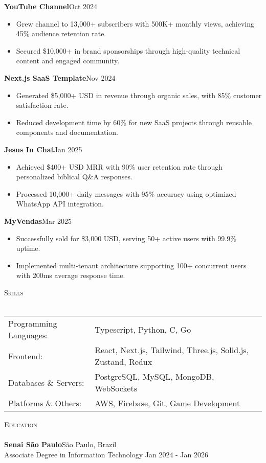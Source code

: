 \documentclass[a4paper]{article}
\newcommand{\lineunder}{
    \vspace*{-8pt} \\
    \hspace*{-18pt} \hrulefill \\
}
\newcommand{\header}[1]{
    {\hspace*{-18pt}\vspace*{6pt} \textsc{#1}}
    \vspace*{-6pt} \lineunder
}
\begin{document}
    \textbf{YouTube Channel}\hfill  Oct 2024\\
    \vspace{-3mm}
    \begin{itemize} \itemsep -3pt
        \item Grew channel to 13,000+ subscribers with 500K+ monthly views, achieving 45\% audience retention rate.
        \item Secured \$10,000+ in brand sponsorships through high-quality technical content and engaged community.
    \end{itemize}

    \textbf{Next.js SaaS Template}\hfill  Nov 2024\\
    \vspace{-3mm}
    \begin{itemize} \itemsep -3pt
        \item Generated \$5,000+ USD in revenue through organic sales, with 85\% customer satisfaction rate.
        \item Reduced development time by 60\% for new SaaS projects through reusable components and documentation.
    \end{itemize}

    \textbf{Jesus In Chat}\hfill  Jan 2025\\
    \vspace{-3mm}
    \begin{itemize} \itemsep -3pt
        \item Achieved \$400+ USD MRR with 90\% user retention rate through personalized biblical Q\&A responses.
        \item Processed 10,000+ daily messages with 95\% accuracy using optimized WhatsApp API integration.
    \end{itemize}

    \textbf{MyVendas}\hfill  Mar 2025\\
    \vspace{-3mm}
    \begin{itemize} \itemsep -3pt
        \item Successfully sold for \$3,000 USD, serving 50+ active users with 99.9\% uptime.
        \item Implemented multi-tenant architecture supporting 100+ concurrent users with 200ms average response time.
    \end{itemize}

    \vspace{1mm}

    \header{Skills}
    \vspace{2mm}
    \begin{longtable}{p{4cm}p{12cm}}
        Programming Languages: & Typescript, Python, C, Go \\
        Frontend: & React, Next.js, Tailwind, Three.js, Solid.js, Zustand, Redux \\
        Databases \& Servers: & PostgreSQL, MySQL, MongoDB, WebSockets \\
        Platforms \& Others: & AWS, Firebase, Git, Game Development \\
    \end{longtable}
    \vspace{1mm}

    \header{Education}
    \vspace{2mm}
    \textbf{Senai São Paulo}\hfill São Paulo, Brazil\\
    Associate Degree in Information Technology \hfill Jan 2024 - Jan 2026\\
\end{document}
